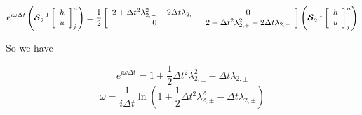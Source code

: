 \documentclass[12pt]{article}
\begin{document}
\[e^{i\omega\Delta t}\left(\boldsymbol{\mathcal{S}}_2^{-1}\left[\begin{array}{c}
h \\ u
\end{array}\right]^{n}_j \right) = \frac{1}{2}\left[\begin{array}{c c}
2 + \Delta t^2 \lambda_{2,-}^2  -2\Delta t\lambda_{2,-}  & 0 \\0  & 2 + \Delta t^2 \lambda_{2,+}^2 -2\Delta t\lambda_{2,-}
\end{array}\right]  \left(\boldsymbol{\mathcal{S}}_2^{-1}\left[\begin{array}{c}
h \\ u
\end{array}\right]^{n}_j \right)  \]

So we have

\[e^{i\omega\Delta t} = 1 + \frac{1}{2}\Delta t^2 \lambda_{2,\pm}^2  -\Delta t\lambda_{2,\pm}\]
\[\omega = \frac{1}{i \Delta t} \ln \left(1 + \frac{1}{2}\Delta t^2 \lambda_{2,\pm}^2  -\Delta t\lambda_{2,\pm}\right) \]
\end{document}
